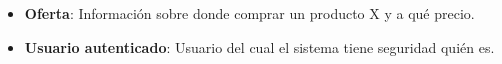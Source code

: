 \begin{itemize}
\itemsep1pt\parskip0pt
\item
  \textbf{Oferta}: Información sobre donde comprar un producto X y a qué
  precio.
\item
  \textbf{Usuario autenticado}: Usuario del cual el sistema tiene
  seguridad quién es.
\end{itemize}

